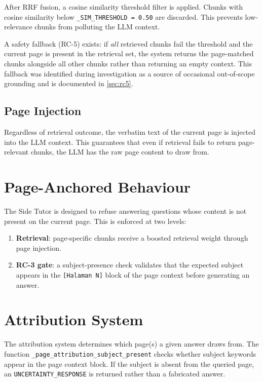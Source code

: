 \documentclass[12pt, a4paper]{report}
\newcommand{\codeinline}[1]{\texttt{#1}}
\begin{document}
After RRF fusion, a cosine similarity threshold filter is applied. Chunks with
cosine similarity below \codeinline{\_SIM\_THRESHOLD = 0.50} are discarded.
This prevents low-relevance chunks from polluting the LLM context.

A safety fallback (RC-5) exists: if \emph{all} retrieved chunks fail the
threshold and the current page is present in the retrieval set, the system
returns the page-matched chunks alongside all other chunks rather than returning
an empty context. This fallback was identified during investigation as a source
of occasional out-of-scope grounding and is documented in \cref{sec:rc5}.

\subsection{Page Injection}

Regardless of retrieval outcome, the verbatim text of the current page is
injected into the LLM context. This guarantees that even if retrieval fails to
return page-relevant chunks, the LLM has the raw page content to draw from.

\section{Page-Anchored Behaviour}

The Side Tutor is designed to refuse answering questions whose content is not
present on the current page. This is enforced at two levels:

\begin{enumerate}[noitemsep]
  \item \textbf{Retrieval}: page-specific chunks receive a boosted retrieval
        weight through page injection.
  \item \textbf{RC-3 gate}: a subject-presence check validates that the
        expected subject appears in the \codeinline{[Halaman N]} block of the
        page context before generating an answer.
\end{enumerate}

\section{Attribution System}

The attribution system determines which page(s) a given answer draws from.
The function \codeinline{\_page\_attribution\_subject\_present} checks whether
subject keywords appear in the page context block. If the subject is absent
from the queried page, an \codeinline{UNCERTAINTY\_RESPONSE} is returned rather
than a fabricated answer.
\end{document}
